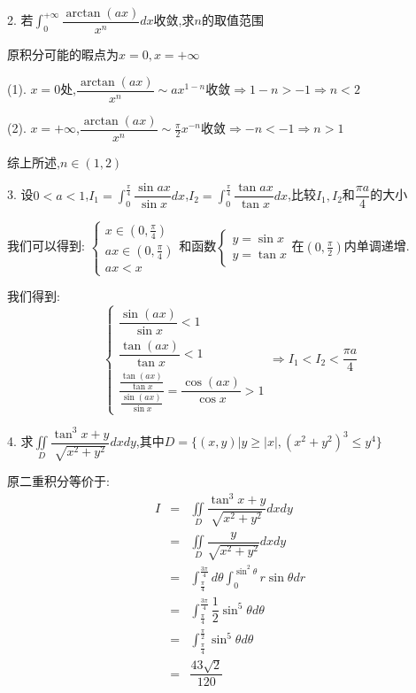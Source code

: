 2. 若$\int_{0}^{+\infty}\dfrac{\arctan(ax)}{x^n}dx$收敛,求$n$的取值范围
\begin{solution}

	原积分可能的暇点为$x=0,x=+\infty$
	
	(1). $x=0$处,$\dfrac{\arctan (ax)}{x^n}\sim ax^{1-n}$收敛$\Rightarrow 1-n>-1\Rightarrow n<2$
	
	(2). $x=+\infty$,$\dfrac{\arctan (ax)}{x^n}\sim \frac{\pi}{2}x^{-n}$收敛$\Rightarrow -n<-1\Rightarrow n>1$
	
	综上所述,$n\in(1,2)$
\end{solution}

3. 设$0<a<1$,$I_{1}=\int_{0}^{\frac{\pi}{4}}\dfrac{\sin ax}{\sin x}dx$,$I_{2}=\int_{0}^{\frac{\pi}{4}}\dfrac{\tan ax}{\tan x}dx$,比较$I_{1},I_{2}$和$\dfrac{\pi a}{4}$的大小
\begin{solution}

	我们可以得到:  $\left\lbrace
	\begin{array}{l}
		x\in(0,\frac{\pi}{4})\\
		ax\in(0,\frac{\pi}{4})\\
		ax<x
	\end{array}
	\right.$和函数$\left\lbrace
	\begin{array}{l}
		y=\sin x\\
		y=\tan x
	\end{array}
	\right. $在$(0,\frac{\pi}{2})$内单调递增.
	
	我们得到:  $$\left\lbrace
	\begin{array}{l}
		\dfrac{\sin(ax)}{\sin x}<1\\
		\dfrac{\tan(ax)}{\tan x}<1\\
		\dfrac{\frac{\tan(ax)}{\tan x}}{\frac{\sin(ax)}{\sin x}}=\dfrac{\cos(ax)}{\cos x}>1
	\end{array}
	\right. \Rightarrow I_{1}<I_{2}<\dfrac{\pi a}{4}$$
\end{solution}

4. 求$\iint\limits_{D}\dfrac{\tan^3x+y}{\sqrt{x^2+y^2}}dxdy$,其中$D=\{(x,y)|y\geq |x|,(x^2+y^2)^3\leq y^4\}$

\begin{solution}

	原二重积分等价于:  
	\begin{eqnarray*}
		I&=&\iint\limits_{D}\dfrac{\tan^3x+y}{\sqrt{x^2+y^2}}dxdy\\
		&=&\iint\limits_{D}\dfrac{y}{\sqrt{x^2+y^2}}dxdy\\
		&=&\int_{\frac{\pi}{4}}^{\frac{3\pi}{4}}d\theta\int_{0}^{\sin^2\theta}r\sin\theta dr\\
		&=&\int_{\frac{\pi}{4}}^{\frac{3\pi}{4}}\dfrac{1}{2}\sin^5\theta d\theta\\
		&=&\int_{\frac{\pi}{4}}^{\frac{\pi}{2}}\sin^5\theta d\theta\\
		&=&\dfrac{43\sqrt{2}}{120}
	\end{eqnarray*}
\end{solution}


